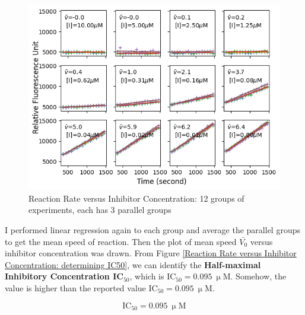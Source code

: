 \documentclass{report}
\begin{document}
\begin{figure}
    \centering
    \includegraphics[width=1\linewidth]{../Figures/inhibitor1.png}
    \caption{Reaction Rate versus Inhibitor Concentration: 12 groups of experiments, each has 3
    parallel groups}
    \label{Reaction Rate versus Inhibitor Concentration: 12 groups of experiments, each has 3
    parallel groups}
\end{figure}

I performed linear regression again to each group and average the parallel groups to get the mean speed of reaction.
Then the plot of mean speed $\bar{V_0}$ versus inhibitor concentration was drawn.
From Figure \ref{Reaction Rate versus Inhibitor Concentration: determining IC50}, we can identify the \textbf{Half-maximal Inhibitory Concentration IC$_{50}$}, which is IC$_{50}=0.095\ \upmu \text{M}$.
Somehow, the value is higher than the reported value IC$_{50}=0.095\ \upmu \text{M}$.

$$
\text{IC}_{50}=0.095\ \upmu \text{M}
$$
\end{document}
